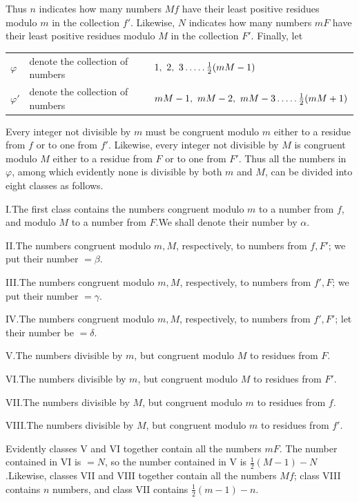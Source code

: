 Thus $n$ indicates how many numbers $Mf$ have their least positive residues modulo $m$ in the collection $f'$. Likewise, $N$ indicates how many numbers $mF$ have their least positive residues modulo $M$ in the collection $F'$. Finally, let

{\small
\begin{center}\setlength{\tabcolsep}{3pt}
\begin{tabular}{@{}lll@{}}
$\varphi$ & denote the collection of numbers & $1,\ 2,\ 3\dotsfive\frac12(mM-1)$ \\
$\varphi'$ & denote the collection of numbers & $mM-1,\ mM-2,\ mM-3\dotsfive\frac12(mM+1)$
\end{tabular}\end{center}
}

Every integer not divisible by $m$ must be congruent modulo $m$ either to a residue from $f$ or to one from $f'$. Likewise, every integer not divisible by $M$ is congruent modulo $M$ either to a residue from $F$ or to one from $F'$. Thus all the numbers in $\varphi$, among which evidently none is divisible by both $m$ and $M$, can be divided into eight classes as follows.

I.\quad The first class contains the numbers congruent modulo $m$ to a number from $f$, and modulo $M$ to a number from $F$.\quad We shall denote their number by $\alpha$.

II.\quad The numbers congruent modulo $m,M$, respectively, to numbers from $f,F'$; we put their number $=\beta$.

III.\quad The numbers congruent modulo $m,M$, respectively, to numbers from $f',F$; we put their number $=\gamma$.

IV.\quad The numbers congruent modulo $m,M$, respectively, to numbers from $f',F'$; let their number be $=\delta$.

V.\quad The numbers divisible by $m$, but congruent modulo $M$ to residues from $F$.

VI.\quad The numbers divisible by $m$, but congruent modulo $M$ to residues from $F'$.

VII.\quad The numbers divisible by $M$, but congruent modulo $m$ to residues from $f$.

VIII.\quad The numbers divisible by $M$, but congruent modulo $m$ to residues from $f'$.

Evidently classes V and VI together contain all the numbers $mF$. The number contained in VI is $=N$, so the number contained in V is $\frac12(M-1)-N$.\quad Likewise, classes VII and VIII together contain all the numbers $Mf$; class VIII contains $n$ numbers, and class VII contains $\frac12(m-1)-n$.

